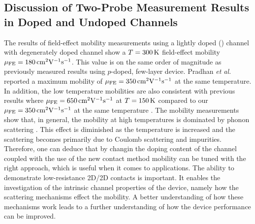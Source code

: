 \subsection{Discussion of Two-Probe Measurement Results in Doped and Undoped Channels}\label{subsec:discussion_two_probe}
The results of field-effect mobility measurements using a lightly doped (\lightlyone) channel with degenerately doped channel show a $T=300\,\mathrm{K}$ field-effect mobility $\mu_\mathrm{FE}=180\,\mathrm{cm}^{2}\mathrm{V}^{-1}\mathrm{s}^{-1}$. This value is on the same order of magnitude as previously measured results using $p$-doped, few-layer  device. Pradhan \emph{et al.} reported a maximum mobility of $\mu_\mathrm{FE}=350\,\mathrm{cm}^{2}\mathrm{V}^{-1}\mathrm{s}^{-1}$ at the same temperature. In addition, the low temperature mobilities are also consistent with previous results where $\mu_\mathrm{FE}=650\,\mathrm{cm}^{2}\mathrm{V}^{-1}\mathrm{s}^{-1}$ at $T=150\,\mathrm{K}$ compared to our $\mu_\mathrm{FE}=350\,\mathrm{cm}^{2}\mathrm{V}^{-1}\mathrm{s}^{-1}$ at the same temperature \cite{Pradhan_SciReports2015}. The mobility measurements show that, in general, the mobility at high temperatures is dominated by phonon scattering \cite{Ando_RevModPhys1982}. This effect is diminished as the temperature is increased and the scattering becomes primarily due to Coulomb scattering and impurities. Therefore, one can deduce that by changin the doping content of the channel coupled with the use of the new contact method mobility can be tuned with the right approach, which is useful when it comes to applications. The ability to demonstrate low-resistance 2D/2D contacts is important. It enables the investigation of the intrinsic channel properties of the device, namely how the scattering mechanisms effect the mobility. A better understanding of how these mechanisms work leads to a further understanding of how the device performance can be improved.

